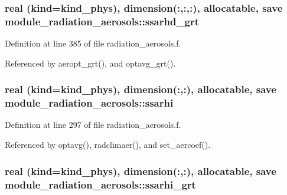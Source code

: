 \subsubsection[{\texorpdfstring{ssarhd\+\_\+grt}{ssarhd_grt}}]{\setlength{\rightskip}{0pt plus 5cm}real (kind=kind\+\_\+phys), dimension(\+:,\+:,\+:), allocatable, save module\+\_\+radiation\+\_\+aerosols\+::ssarhd\+\_\+grt\hspace{0.3cm}{\ttfamily [private]}}\hypertarget{namespacemodule__radiation__aerosols_a4aa91ab1d0b9d71c704dc565ef4704bf}{}\label{namespacemodule__radiation__aerosols_a4aa91ab1d0b9d71c704dc565ef4704bf}


Definition at line 385 of file radiation\+\_\+aerosols.\+f.



Referenced by aeropt\+\_\+grt(), and optavg\+\_\+grt().

\subsubsection[{\texorpdfstring{ssarhi}{ssarhi}}]{\setlength{\rightskip}{0pt plus 5cm}real (kind=kind\+\_\+phys), dimension(\+:,\+:), allocatable, save module\+\_\+radiation\+\_\+aerosols\+::ssarhi\hspace{0.3cm}{\ttfamily [private]}}\hypertarget{namespacemodule__radiation__aerosols_ae4e1ead8bb34371c2d9f1b428846c10c}{}\label{namespacemodule__radiation__aerosols_ae4e1ead8bb34371c2d9f1b428846c10c}


Definition at line 297 of file radiation\+\_\+aerosols.\+f.



Referenced by optavg(), radclimaer(), and set\+\_\+aercoef().

\subsubsection[{\texorpdfstring{ssarhi\+\_\+grt}{ssarhi_grt}}]{\setlength{\rightskip}{0pt plus 5cm}real (kind=kind\+\_\+phys), dimension(\+:,\+:), allocatable, save module\+\_\+radiation\+\_\+aerosols\+::ssarhi\+\_\+grt\hspace{0.3cm}{\ttfamily [private]}}\hypertarget{namespacemodule__radiation__aerosols_ae8587d9b4ebd9cf5d363a82d15049324}{}\label{namespacemodule__radiation__aerosols_ae8587d9b4ebd9cf5d363a82d15049324}


